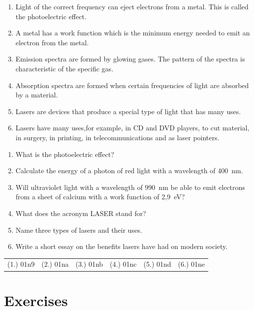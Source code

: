 \begin{enumerate}
\item Light of the correct frequency can eject electrons from a metal. This is called the photoelectric effect.
\item A metal has a work function which is the minimum energy needed to emit an electron from the metal. 
\item Emission spectra are formed by glowing gases. The pattern of the spectra is characteristic of the specific gas. 
\item Absorption spectra are formed when certain frequencies of light are absorbed by a material.
\item Lasers are devices that produce a special type of light that has many uses.
\item Lasers have many uses,for example, in CD and DVD players, to cut material, in surgery, in printing, in telecommunications and as laser pointers.
\end{enumerate}


\begin{eocexercises}{}
\begin{enumerate}
\item What is the photoelectric effect? 
\item Calculate the energy of a photon of red light with a wavelength of 400~nm.
\item Will ultraviolet light with a wavelength of 990~nm be able to emit electrons from a sheet of calcium with a work function of 2,9~eV?
\item What does the acronym LASER stand for?
\item Name three types of lasers and their uses.
\item Write a short essay on the benefits lasers have had on modern society.
\end{enumerate}

\par \practiceinfo
\par \begin{tabular}[h]{cccccc}
(1.)	01n9	&
(2.)	01na	&
(3.)	01nb	&
(4.)	01nc	&
(5.)	01nd	&
(6.)	01ne	\\ %
\end{tabular}
\end{eocexercises}









\part{Exercises}
